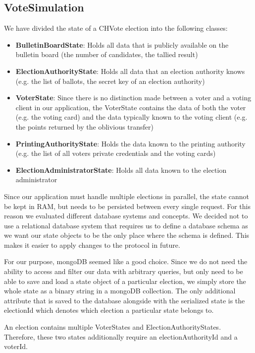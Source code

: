 \subsection{VoteSimulation}
We have divided the state of a CHVote election into the following classes:
\begin{itemize}
	\item \textbf{BulletinBoardState}: Holds all data that is publicly available on the bulletin board (the number of candidates, the tallied result)
	\item \textbf{ElectionAuthorityState}: Holds all data that an election authority knows (e.g. the list of ballots, the secret key of an election authority)
	\item \textbf{VoterState}: Since there is no distinction made between a voter and a voting client in our application, the VoterState contains the data of both the voter (e.g. the voting card) and the data typically known to the voting client (e.g. the points returned by the oblivious transfer)
	\item \textbf{PrintingAuthorityState}: Holds the data known to the printing authority (e.g. the list of all voters private credentials and the voting cards)
	\item \textbf{ElectionAdministratorState}: Holds all data known to the election administrator 
\end{itemize}

Since our application must handle multiple elections in parallel, the state cannot be kept in RAM, but needs to be persisted between every single request. For this reason we evaluated different database systems and concepts. We decided not to use a relational database system that requires us to define a database schema as we want our state objects to be the only place where the schema is defined. This makes it easier to apply changes to the protocol in future. 

For our purpose, mongoDB seemed like a good choice. Since we do not need the ability to access and filter our data with arbitrary queries, but only need to be able to save and load a state object of a particular election, we simply store the whole state as a binary string in a mongoDB collection. The only additional attribute that is saved to the database alongside with the serialized state is the electionId which denotes which election a particular state belongs to. 

An election contains multiple VoterStates and ElectionAuthorityStates. Therefore, these two states additionally require an electionAuthorityId and a voterId.

